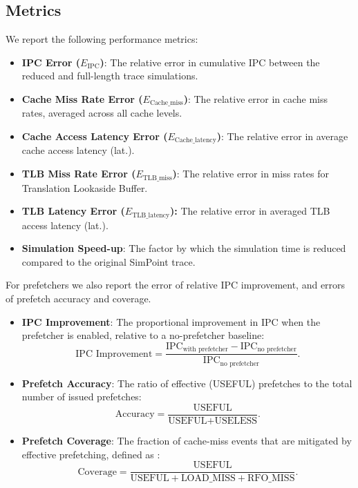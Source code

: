 \subsection{Metrics}
We report the following performance metrics:
\begin{itemize}[nosep, leftmargin=*]
    \item \textbf{IPC Error ($E_{\text{IPC}}$)}: The relative error in cumulative IPC between the reduced and full-length trace simulations.
    \item \textbf{Cache Miss Rate Error ($E_{\text{Cache\_miss}}$)}: The relative error in cache miss rates, averaged across all cache levels.
    \item \textbf{Cache Access Latency Error ($E_{\text{Cache\_latency}}$)}: The relative error in average cache access {latency (lat.)}.
    \item \textbf{TLB Miss Rate Error ($E_{\text{TLB\_miss}}$)}: The relative error in miss rates for Translation Lookaside Buffer.
    \item \textbf{TLB Latency Error ($E_{\text{TLB\_latency}}$):} The relative error in averaged TLB access {latency (lat.)}.
    \item \textbf{Simulation Speed-up}: The factor by which the simulation time is reduced compared to the original SimPoint trace.
\end{itemize}
For prefetchers we also report the error of relative IPC improvement, and errors of prefetch accuracy and coverage.
\begin{itemize}[nosep, leftmargin=*]
    \item \textbf{IPC Improvement}: The proportional improvement in IPC when the prefetcher is enabled, relative to a no-prefetcher baseline:
    \[
    \text{IPC Improvement} = \frac{\text{IPC}_{\text{with prefetcher}} - \text{IPC}_{\text{no prefetcher}}}{\text{IPC}_{\text{no prefetcher}}}.
    \]
    \item \textbf{Prefetch Accuracy}: The ratio of effective (USEFUL) prefetches to the total number of issued prefetches:
    \[
    \text{Accuracy} = \frac{\text{USEFUL}}{\text{USEFUL} + \text{USELESS}}.
    \]
    \item \textbf{Prefetch Coverage}: The fraction of cache-miss events that are mitigated by effective prefetching, defined as :
    \[
    \text{Coverage} = \frac{\text{USEFUL}}{\text{USEFUL} + \text{LOAD\_MISS} + \text{RFO\_MISS}}.
    \]
\end{itemize}
